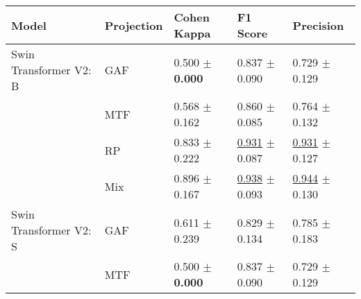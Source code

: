 
\begin{tabular}{lllll}
\toprule
Model & Projection & Cohen Kappa & F1 Score & Precision \\
\midrule
Swin Transformer V2: B & GAF & \textcolor[rgb]{1.0000000000,0.0000000000,0}{0.500} $\pm$ \textbf{\textcolor[rgb]{0.0000000000,0.5000000000,0}{0.000}} & \textcolor[rgb]{0.9367088608,0.0632911392,0}{0.837} $\pm$ \textcolor[rgb]{0.0948745076,0.5000000000,0}{0.090} & \textcolor[rgb]{1.0000000000,0.0000000000,0}{0.729} $\pm$ \textcolor[rgb]{0.2036354899,0.5000000000,0}{0.129} \\
 & MTF & \textcolor[rgb]{0.8363636364,0.1636363636,0}{0.568} $\pm$ \textcolor[rgb]{0.6281710659,0.3718289341,0}{0.162} & \textcolor[rgb]{0.7531645570,0.2468354430,0}{0.860} $\pm$ \textcolor[rgb]{0.0344408387,0.5000000000,0}{0.085} & \textcolor[rgb]{0.8437500000,0.1562500000,0}{0.764} $\pm$ \textcolor[rgb]{0.2541502773,0.5000000000,0}{0.132} \\
 & RP & \textcolor[rgb]{0.2000000000,0.5000000000,0}{0.833} $\pm$ \textcolor[rgb]{0.8622338316,0.1377661684,0}{0.222} & \underline{\textcolor[rgb]{0.1898734177,0.5000000000,0}{0.931}} $\pm$ \textcolor[rgb]{0.0632754743,0.5000000000,0}{0.087} & \underline{\textcolor[rgb]{0.0937500000,0.5000000000,0}{0.931}} $\pm$ \textcolor[rgb]{0.1824399184,0.5000000000,0}{0.127} \\
 & Mix & \textcolor[rgb]{0.0500000000,0.5000000000,0}{0.896} $\pm$ \textcolor[rgb]{0.6494330637,0.3505669363,0}{0.167} & \underline{\textcolor[rgb]{0.1329113924,0.5000000000,0}{0.938}} $\pm$ \textcolor[rgb]{0.1396456218,0.5000000000,0}{0.093} & \underline{\textcolor[rgb]{0.0312500000,0.5000000000,0}{0.944}} $\pm$ \textcolor[rgb]{0.2186313288,0.5000000000,0}{0.130} \\
Swin Transformer V2: S & GAF & \textcolor[rgb]{0.7333333333,0.2666666667,0}{0.611} $\pm$ \textcolor[rgb]{0.9296117033,0.0703882967,0}{0.239} & \textcolor[rgb]{1.0000000000,0.0000000000,0}{0.829} $\pm$ \textcolor[rgb]{0.7384477757,0.2615522243,0}{0.134} & \textcolor[rgb]{0.7500000000,0.2500000000,0}{0.785} $\pm$ \textcolor[rgb]{1.0000000000,0.0000000000,0}{0.183} \\
 & MTF & \textcolor[rgb]{1.0000000000,0.0000000000,0}{0.500} $\pm$ \textbf{\textcolor[rgb]{0.0000000000,0.5000000000,0}{0.000}} & \textcolor[rgb]{0.9367088608,0.0632911392,0}{0.837} $\pm$ \textcolor[rgb]{0.0948745076,0.5000000000,0}{0.090} & \textcolor[rgb]{1.0000000000,0.0000000000,0}{0.729} $\pm$ \textcolor[rgb]{0.2036354899,0.5000000000,0}{0.129} \\

\end{tabular}
